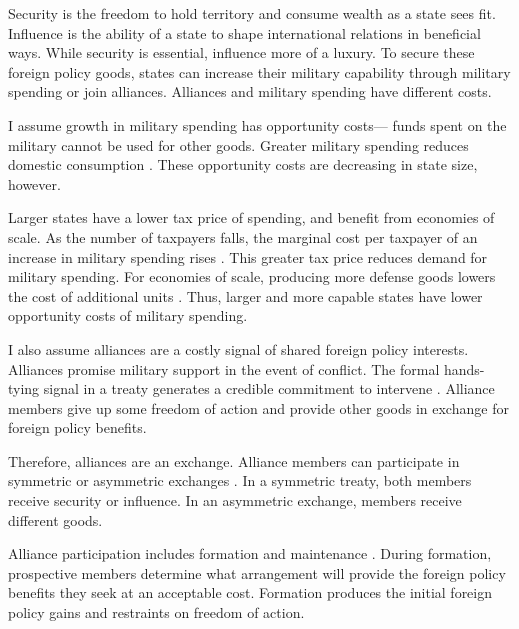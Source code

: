 \documentclass[12pt]{article}
\begin{document}
Security is the freedom to hold territory and consume wealth as a state sees fit. 
Influence is the ability of a state to shape international relations in beneficial ways. 
While security is essential, influence more of a luxury. 
To secure these foreign policy goods, states can increase their military capability through military spending or join alliances. 
Alliances and military spending have different costs. 


I assume growth in military spending has opportunity costs--- funds spent on the military cannot be used for other goods. 
Greater military spending reduces domestic consumption \citep{Fearon2018}. 
These opportunity costs are decreasing in state size, however. 


Larger states have a lower tax price of spending, and benefit from economies of scale. 
As the number of taxpayers falls, the marginal cost per taxpayer of an increase in military spending rises \citep{DudleyMontmarquette1981}. 
This greater tax price reduces demand for military spending. 
For economies of scale, producing more defense goods lowers the cost of additional units \citep{Moravcsik1991, AlesinaSpolaore2006}. 
Thus, larger and more capable states have lower opportunity costs of military spending. 


I also assume alliances are a costly signal of shared foreign policy interests. 
Alliances promise military support in the event of conflict. 
The formal hands-tying signal in a treaty generates a credible commitment to intervene \citep{Fearon1997, Leeds2003}.
Alliance members give up some freedom of action and provide other goods in exchange for foreign policy benefits. 


Therefore, alliances are an exchange. 
Alliance members can participate in symmetric or asymmetric exchanges \citet{Morrow1991}.
In a symmetric treaty, both members receive security or influence. 
In an asymmetric exchange, members receive different goods.  


Alliance participation includes formation and maintenance \citep{Snyder1997}. 
During formation, prospective members determine what arrangement will provide the foreign policy benefits they seek at an acceptable cost. 
Formation produces the initial foreign policy gains and restraints on freedom of action. 
\end{document}
